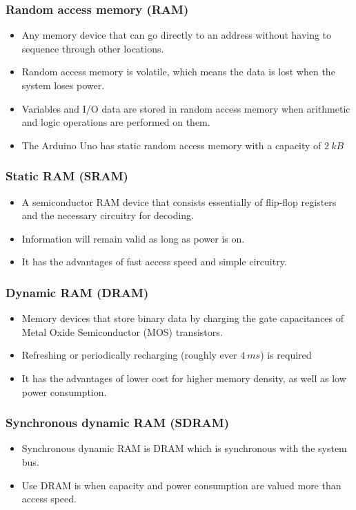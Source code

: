 \documentclass[11pt]{article}
\begin{document}
\subsubsection{Random access memory (RAM)}
\label{sec:orga816f9c}
\begin{itemize}
\item Any memory device that can go directly to an address without having to sequence through other locations.
\item Random access memory is volatile, which means the data is lost when the system loses power.
\item Variables and I/O data are stored in random access memory when arithmetic and logic operations are performed on them.
\item The Arduino Uno has static random access memory with a capacity of \(\qty{2}{kB}\)
\end{itemize}
\subsubsection{Static RAM (SRAM)}
\label{sec:org6b44476}
\begin{itemize}
\item A semiconductor RAM device that consists essentially of flip-flop registers and the necessary circuitry for decoding.
\item Information will remain valid as long as power is on.
\item It has the advantages of fast access speed and simple circuitry.
\end{itemize}
\subsubsection{Dynamic RAM (DRAM)}
\label{sec:org200f029}
\begin{itemize}
\item Memory devices that store binary data by charging the gate capacitances of Metal Oxide Semiconductor (MOS) transistors.
\item Refreshing or periodically recharging (roughly ever \(\qty{4}{ms}\)) is required
\item It has the advantages of lower cost for higher memory density, as well as low power consumption.
\end{itemize}
\subsubsection{Synchronous dynamic RAM (SDRAM)}
\label{sec:org0aae032}
\begin{itemize}
\item Synchronous dynamic RAM is DRAM which is synchronous with the system bus.
\item Use DRAM is when capacity and power consumption are valued more than access speed.
\end{itemize}
\end{document}

